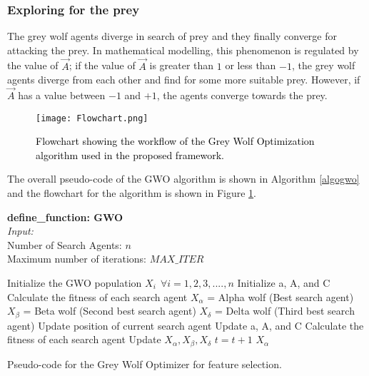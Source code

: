 \documentclass{llncs}
\begin{document}
\subsubsection{Exploring for the prey}
The grey wolf agents diverge in search of prey and they finally converge for attacking the prey. In mathematical modelling, this phenomenon is regulated by the value of $\Vec{A}$; if the value of $\Vec{A}$ is greater than $1$ or less than $-1$, the grey wolf agents diverge from each other and find for some more suitable prey. However, if $\Vec{A}$ has a value between $-1$ and $+1$, the agents converge towards the prey.

\begin{figure}
    \centering
    \texttt{[image: Flowchart.png]}
    \caption{\textcolor{black}{Flowchart showing the workflow of the Grey Wolf Optimization algorithm used in the proposed framework.}}
    \label{flowchart}
\end{figure}

The overall pseudo-code of the GWO algorithm is shown in Algorithm \ref{algogwo} and the flowchart for the algorithm is shown in Figure \ref{flowchart}.
\begin{algorithm}[h]
    {\small
    \textbf{define\_function: GWO}\\
    {\em Input:}\\
    Number of Search Agents: $n$\\
    Maximum number of iterations: $MAX\_ITER$
    \begin{algorithmic}[]
    \STATE Initialize the GWO population $X_i\:\: \forall i=1,2,3,....,n$
    \STATE Initialize a, A, and C 
    \STATE Calculate the fitness of each search agent
    \STATE $X_{\alpha}$ = Alpha wolf (Best search agent)
    \STATE $X_{\beta}$ = Beta wolf (Second best search agent)
    \STATE $X_{\delta}$ = Delta wolf (Third best search agent)
        \STATE{}
            \STATE{}
                \STATE Update position of current search agent 
            \ENDFOR
            \STATE Update a, A, and C
            \STATE Calculate the fitness of each search agent
            \STATE Update $X_{\alpha}, X_{\beta}, X_{\delta}$ 
            \STATE $t=t+1$
        \ENDWHILE
     $X_{\alpha}$
    \end{algorithmic}
    
    \caption{Pseudo-code for the Grey Wolf Optimizer for feature selection.}
    \label{algogwo}
    }
\end{algorithm}
\end{document}
